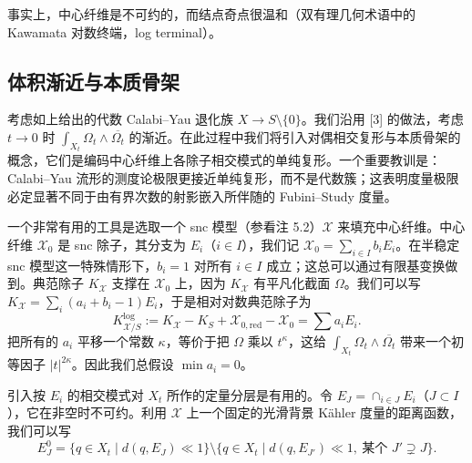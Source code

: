 
事实上，中心纤维是不可约的，而结点奇点很温和（双有理几何术语中的 Kawamata 对数终端，log terminal）。

\subsection{体积渐近与本质骨架}

考虑如上给出的代数 Calabi--Yau 退化族 $X\to S\setminus\{0\}$。我们沿用 [3] 的做法，考虑 $t\to0$ 时 $\int_{X_t}\Omega_t\wedge\overline{\Omega_t}$ 的渐近。在此过程中我们将引入对偶相交复形与本质骨架的概念，它们是编码中心纤维上各除子相交模式的单纯复形。一个重要教训是：Calabi--Yau 流形的测度论极限更接近单纯复形，而不是代数簇；这表明度量极限必定显著不同于由有界次数的射影嵌入所伴随的 Fubini--Study 度量。


一个非常有用的工具是选取一个 snc 模型（参看注 5.2）$\mathcal{X}$ 来填充中心纤维。中心纤维 $\mathcal{X}_0$ 是 snc 除子，其分支为 $E_i$（$i\in I$），我们记 $\mathcal{X}_0=\sum_{i\in I}b_iE_i$。在半稳定 snc 模型这一特殊情形下，$b_i=1$ 对所有 $i\in I$ 成立；这总可以通过有限基变换做到。典范除子 $K_{\mathcal{X}}$ 支撑在 $\mathcal{X}_0$ 上，因为 $K_{\mathcal{X}}$ 有平凡化截面 $\Omega$。我们可以写 $K_{\mathcal{X}}=\sum_i(a_i+b_i-1)E_i$，于是相对对数典范除子为
\[
K^{\log}_{\mathcal{X}/S} := K_{\mathcal{X}} - K_S + \mathcal{X}_{0,\mathrm{red}} - \mathcal{X}_0 = \sum a_iE_i.
\]
把所有的 $a_i$ 平移一个常数 $\kappa$，等价于把 $\Omega$ 乘以 $t^{\kappa}$，这给 $\int_{X_t}\Omega_t\wedge\overline{\Omega_t}$ 带来一个初等因子 $|t|^{2\kappa}$。因此我们总假设 $\min a_i=0$。


引入按 $E_i$ 的相交模式对 $X_t$ 所作的定量分层是有用的。令 $E_J=\cap_{i\in J}E_i$（$J\subset I$），它在非空时不可约。利用 $\mathcal{X}$ 上一个固定的光滑背景 Kähler 度量的距离函数，我们可以写
\[
E^0_J = \{q\in X_t\mid d(q,E_J)\ll1\}\setminus\{q\in X_t\mid d(q,E_{J'})\ll1,\ \text{某个 } J'\supsetneq J\}.
\]

